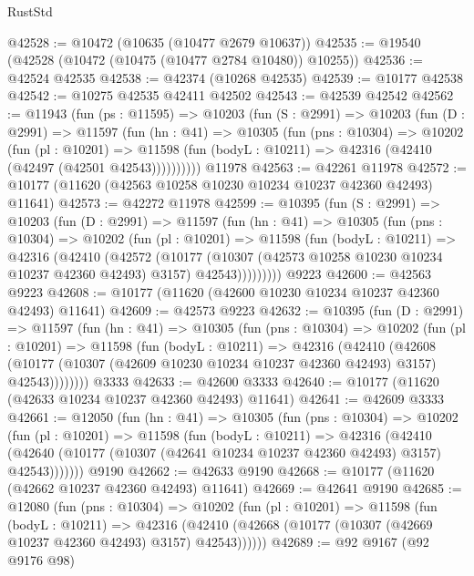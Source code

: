 \begin{lexlean}{RustStd}
\begin{coremodule}
@42528 := @10472 (@10635 (@10477 @2679 @10637))
@42535 := @19540 (@42528 (@10472 (@10475 (@10477 @2784 @10480)) @10255))
@42536 := @42524 @42535
@42538 := @42374 (@10268 @42535)
@42539 := @10177 @42538
@42542 := @10275 @42535 @42411 @42502
@42543 := @42539 @42542
@42562 := @11943
    (fun (ps : @11595) =>
    @10203
      (fun (S : @2991) =>
      @10203
        (fun (D : @2991) =>
        @11597
          (fun (hn : @41) =>
          @10305
            (fun (pns : @10304) =>
            @10202
              (fun (pl : @10201) =>
              @11598 (fun (bodyL : @10211) => @42316 (@42410 (@42497 (@42501 @42543))))))))))
    @11978
@42563 := @42261 @11978
@42572 := @10177 (@11620 (@42563 @10258 @10230 @10234 @10237 @42360 @42493) @11641)
@42573 := @42272 @11978
@42599 := @10395
    (fun (S : @2991) =>
    @10203
      (fun (D : @2991) =>
      @11597
        (fun (hn : @41) =>
        @10305
          (fun (pns : @10304) =>
          @10202
            (fun (pl : @10201) =>
            @11598
              (fun (bodyL : @10211) =>
              @42316
                (@42410
                  (@42572
                    (@10177
                      (@10307 (@42573 @10258 @10230 @10234 @10237 @42360 @42493) @3157)
                      @42543)))))))))
    @9223
@42600 := @42563 @9223
@42608 := @10177 (@11620 (@42600 @10230 @10234 @10237 @42360 @42493) @11641)
@42609 := @42573 @9223
@42632 := @10395
    (fun (D : @2991) =>
    @11597
      (fun (hn : @41) =>
      @10305
        (fun (pns : @10304) =>
        @10202
          (fun (pl : @10201) =>
          @11598
            (fun (bodyL : @10211) =>
            @42316
              (@42410
                (@42608
                  (@10177 (@10307 (@42609 @10230 @10234 @10237 @42360 @42493) @3157) @42543))))))))
    @3333
@42633 := @42600 @3333
@42640 := @10177 (@11620 (@42633 @10234 @10237 @42360 @42493) @11641)
@42641 := @42609 @3333
@42661 := @12050
    (fun (hn : @41) =>
    @10305
      (fun (pns : @10304) =>
      @10202
        (fun (pl : @10201) =>
        @11598
          (fun (bodyL : @10211) =>
          @42316
            (@42410
              (@42640 (@10177 (@10307 (@42641 @10234 @10237 @42360 @42493) @3157) @42543)))))))
    @9190
@42662 := @42633 @9190
@42668 := @10177 (@11620 (@42662 @10237 @42360 @42493) @11641)
@42669 := @42641 @9190
@42685 := @12080
    (fun (pns : @10304) =>
    @10202
      (fun (pl : @10201) =>
      @11598
        (fun (bodyL : @10211) =>
        @42316 (@42410 (@42668 (@10177 (@10307 (@42669 @10237 @42360 @42493) @3157) @42543))))))
@42689 := @92 @9167 (@92 @9176 @98)

\end{coremodule}
\end{lexlean}
